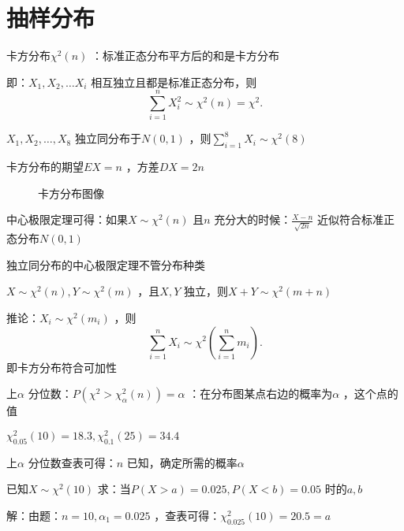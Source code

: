 \section{抽样分布}%
\label{sec:抽样分布}
\begin{defi}
    卡方分布$\chi^2 \left( n \right)$ ：标准正态分布平方后的和是卡方分布
\end{defi}
即：$X_1,X_2,\ldots X_{i}$ 相互独立且都是标准正态分布，则\[
    \sum_{i=1}^{n} X_{i}^2 \sim \chi^2 \left( n \right)=\chi^2 
.\]
\begin{eg}
    $X_1,X_2,\ldots ,X_8$ 独立同分布于$N\left( 0,1 \right)$ ，则$\sum_{i=1}^{8} X_{i}\sim \chi^2 \left( 8 \right)$
\end{eg}
\begin{cor}
    卡方分布的期望$EX=n$ ，方差$DX=2n$
\end{cor}
\begin{figure}[ht]
    \centering
    \caption{卡方分布图像}
    \label{fig:卡方分布图像}
\end{figure}
\begin{cor}
    中心极限定理可得：如果$X\sim \chi^2 \left( n \right)$ 且$n$ 充分大的时候：$\frac{X-n}{\sqrt{2n}}$ 近似符合标准正态分布$N\left( 0,1 \right)$
\end{cor}
\begin{notation}
    独立同分布的中心极限定理不管分布种类
\end{notation}
\begin{cor}
    $X\sim \chi^2 \left( n \right),Y\sim \chi^2 \left( m \right)$ ，且$X,Y$ 独立，则$X+Y\sim \chi^2 \left( m+n \right)$
\end{cor}
\begin{notation}
推论：$X_{i}\sim \chi^2 \left( m_{i} \right)$ ，则\[
    \sum_{i=1}^{n} X_{i}\sim \chi^2 \left( \sum_{i=1}^{n} m_{i} \right)
.\]
即卡方分布符合可加性
\end{notation}
\begin{defi}
上$\alpha$ 分位数：$P\left( \chi^2 >\chi^2_{\alpha} \left( n \right) \right)=\alpha$ ：在分布图某点右边的概率为$\alpha$ ，这个点的值
\end{defi}
\begin{eg}
    $\chi^2 _{0.05}\left( 10 \right)=18.3,\chi^2 _{0.1}\left( 25 \right)=34.4$
\end{eg}
上$\alpha$ 分位数查表可得：$n$ 已知，确定所需的概率$\alpha$ 
\begin{eg}
    已知$X\sim \chi^2 \left( 10 \right)$ 求：当$P\left( X>a \right)=0.025,P\left( X<b \right)=0.05$ 时的$a,b$
\end{eg}
解：由题：$n=10,\alpha_1=0.025$ ，查表可得：$\chi^2 _{0.025}\left( 10 \right)=20.5=a$ 


